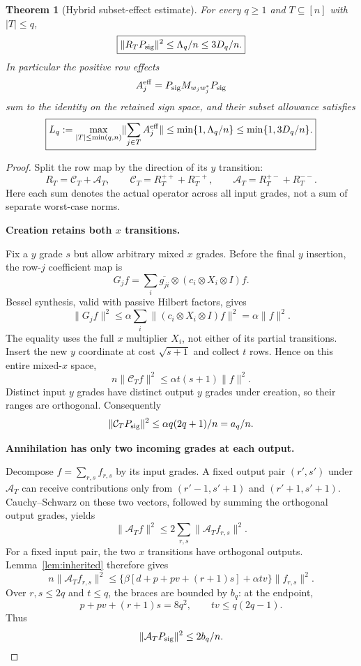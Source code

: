 \documentclass[11pt]{article}
\numberwithin{equation}{section}
\newtheorem{theorem}{Theorem}[section]
\theoremstyle{definition}\newtheorem{definition}[theorem]{Definition}
\theoremstyle{remark}\newtheorem{remark}[theorem]{Remark}
\newcommand{\norm}[1]{\lVert#1\rVert}\newcommand{\ip}[2]{\langle#1,#2\rangle}
\newcommand{\step}[1]{\par\addvspace{.65\baselineskip}\Needspace{4\baselineskip}\noindent\textbf{#1}\par\nobreak\smallskip}
\begin{document}
\begin{theorem}[Hybrid subset-effect estimate]
\label{thm:subset}
For every $q\ge1$ and $T\subseteq[n]$ with $|T|\le q$,
\begin{equation}
 \boxed{\norm{R_TP_{\rm sig}}^2\le\Lambda_q/n\le3D_q/n.}
 \label{eq:rownew}
\end{equation}
In particular the positive row effects
\[
 A_j^{\rm eff}=P_{\rm sig}M_{w_jw_j^*}P_{\rm sig}
\]
sum to the identity on the retained sign space, and their subset allowance satisfies
\begin{equation}
 \boxed{L_q:=\max_{|T|\le\min(q,n)}\norm{\sum_{j\in T}A_j^{\rm eff}}
    \le\min\{1,\Lambda_q/n\}\le\min\{1,3D_q/n\}.}
 \label{eq:Lnew}
\end{equation}
\end{theorem}
\begin{proof}
Split the row map by the direction of its $y$ transition:
\[
 R_T=\mathcal C_T+\mathcal A_T,
 \qquad \mathcal C_T=R_T^{++}+R_T^{-+},
 \qquad \mathcal A_T=R_T^{+-}+R_T^{--}.
\]
Here each sum denotes the actual operator across all input grades, not a sum of separate worst-case norms.

\step{Creation retains both $x$ transitions.}
Fix a $y$ grade $s$ but allow arbitrary mixed $x$ grades. Before the final $y$ insertion, the row-$j$ coefficient map is
\[
 G_jf=\sum_i\overline{g_{ji}}\otimes
       (c_i\otimes X_i\otimes I)f.
\]
Bessel synthesis, valid with passive Hilbert factors, gives
\[
 \norm{G_jf}^2\le\alpha\sum_i\norm{(c_i\otimes X_i\otimes I)f}^2
       =\alpha\norm f^2.
\]
The equality uses the full $x$ multiplier $X_i$, not either of its partial transitions. Insert the new $y$ coordinate at cost $\sqrt{s+1}$ and collect $t$ rows. Hence on this entire mixed-$x$ space,
\[
 n\norm{\mathcal C_T f}^2\le\alpha t(s+1)\norm f^2.
\]
Distinct input $y$ grades have distinct output $y$ grades under creation, so their ranges are orthogonal. Consequently
\begin{equation}
 \norm{\mathcal C_TP_{\rm sig}}^2
       \le\alpha q(2q+1)/n=a_q/n.
 \label{eq:creationnew}
\end{equation}

\step{Annihilation has only two incoming grades at each output.}
Decompose $f=\sum_{r,s}f_{r,s}$ by its input grades. A fixed output pair $(r',s')$ under $\mathcal A_T$ can receive contributions only from $(r'-1,s'+1)$ and $(r'+1,s'+1)$. Cauchy--Schwarz on these two vectors, followed by summing the orthogonal output grades, yields
\[
 \norm{\mathcal A_Tf}^2\le2\sum_{r,s}\norm{\mathcal A_Tf_{r,s}}^2.
\]
For a fixed input pair, the two $x$ transitions have orthogonal outputs. Lemma~\ref{lem:inherited} therefore gives
\[
 n\norm{\mathcal A_Tf_{r,s}}^2
 \le\big\{\beta[d+p+pv+(r+1)s]+\alpha tv\big\}\norm{f_{r,s}}^2.
\]
Over $r,s\le2q$ and $t\le q$, the braces are bounded by $b_q$: at the endpoint,
\[
 p+pv+(r+1)s=8q^2,\qquad tv\le q(2q-1).
\]
Thus
\begin{equation}
 \norm{\mathcal A_TP_{\rm sig}}^2\le2b_q/n.
 \label{eq:annihnew}
\end{equation}


\end{proof}
\end{document}
